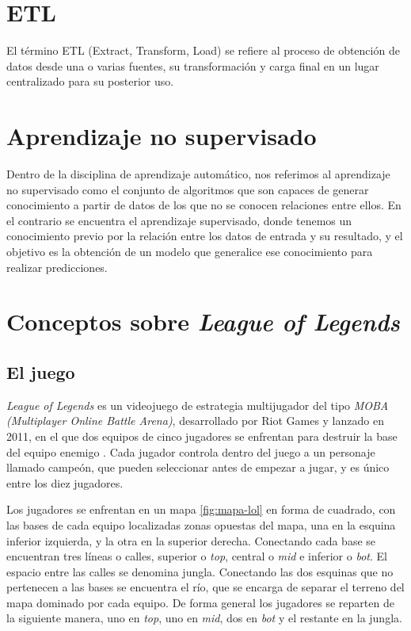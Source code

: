 
\section{ETL}
El término ETL (Extract, Transform, Load) se refiere al proceso de obtención de datos desde una o varias fuentes, su transformación y carga final en un lugar centralizado para su posterior uso.

\section{Aprendizaje no supervisado}
Dentro de la disciplina de aprendizaje automático, nos referimos al aprendizaje no supervisado como el conjunto de algoritmos que son capaces de generar conocimiento a partir de datos de los que no se conocen relaciones entre ellos. En el contrario se encuentra el aprendizaje supervisado, donde tenemos un conocimiento previo por la relación entre los datos de entrada y su resultado, y el objetivo es la obtención de un modelo que generalice ese conocimiento para realizar predicciones.

\section{Conceptos sobre \textit{League of Legends}}

\subsection{El juego}
\textit{League of Legends} es un videojuego de estrategia multijugador del tipo \textit{MOBA (Multiplayer Online Battle Arena)}, desarrollado por Riot Games y lanzado en 2011, en el que dos equipos de cinco jugadores se enfrentan para destruir la base del equipo enemigo \cite{misc:como-jugar}. Cada jugador controla dentro del juego a un personaje llamado campeón, que pueden seleccionar antes de empezar a jugar, y es único entre los diez jugadores.

Los jugadores se enfrentan en un mapa \ref{fig:mapa-lol} en forma de cuadrado, con las bases de cada equipo localizadas zonas opuestas del mapa, una en la esquina inferior izquierda, y la otra en la superior derecha. Conectando cada base se encuentran tres líneas o calles, superior o \textit{top}, central o \textit{mid} e inferior o \textit{bot}. El espacio entre las calles se denomina jungla. Conectando las dos esquinas que no pertenecen a las bases se encuentra el río, que se encarga de separar el terreno del mapa dominado por cada equipo. De forma general los jugadores se reparten de la siguiente manera, uno en \textit{top}, uno en \textit{mid}, dos en \textit{bot} y el restante en la jungla.

